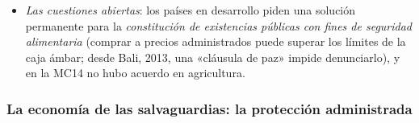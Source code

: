 \documentclass[11pt]{article}
\begin{document}
\begin{itemize}
\item \emph{Las cuestiones abiertas}: los países en desarrollo piden una solución permanente para la \emph{constitución de existencias públicas con fines de seguridad alimentaria} (comprar a precios administrados puede superar los límites de la caja ámbar; desde Bali, 2013, una «cláusula de paz» impide denunciarlo), y en la MC14 no hubo acuerdo en agricultura\nocite{OMC2026CG0714}.
\end{itemize}

\subsubsection{La economía de las salvaguardias:\cortetitulo{} la protección administrada}\label{sec:salvaguardias}
\end{document}
